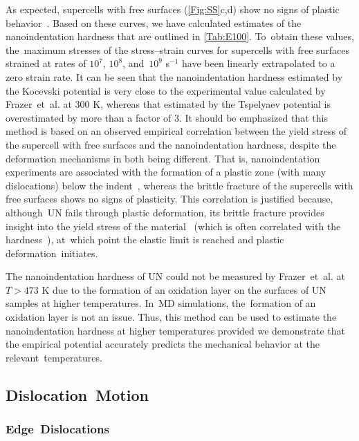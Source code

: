 \documentclass[applsci,article,accept,pdftex,moreauthors]{Definitions/mdpi}
\newcommand{\?}{\stackrel{?}{=}}
\begin{document}
As expected, supercells with free surfaces (\cref{Fig:SS}c,d) show no signs of plastic behavior~\cite{Ivashchenko2007}. Based on these curves, we have calculated estimates of the nanoindentation hardness that are outlined in \cref{Tab:E100}. To~obtain these values, the~maximum stresses of the stress--strain curves for supercells with free surfaces strained at rates of $10^7$, $10^8$, and~$10^9$ s$^{-1}$ have been linearly extrapolated to a zero strain rate. It can be seen that the nanoindentation hardness estimated by the Kocevski potential is very close to the experimental value calculated by Frazer~et~al. \cite{Frazer2021} at 300 K, whereas that estimated by the Tspelyaev potential is overestimated by more than a factor of 3. It should be emphasized that this method is based on an observed empirical correlation between the yield stress of the supercell with free surfaces and the nanoindentation hardness, despite the deformation mechanisms in both being different. That is, nanoindentation experiments are associated with the formation of a plastic zone (with many dislocations) below the indent~\cite{Adachi2009}, whereas the brittle fracture of the supercells with free surfaces shows no signs of plasticity. This correlation is justified because, although~UN fails through plastic deformation, its brittle fracture provides insight into the yield stress of the material~\cite{Taylor2008} (which is often correlated with the hardness~\cite{Meyers2009}), at~which point the elastic limit is reached and plastic deformation~initiates.

The nanoindentation hardness of UN could not be measured by Frazer~et~al. \cite{Frazer2021} at $T > 473$ K due to the formation of an oxidation layer on the surfaces of UN samples at higher temperatures. In~MD simulations, the~formation of an oxidation layer is not an issue. Thus, this method can be used to estimate the nanoindentation hardness at higher temperatures provided we demonstrate that the empirical potential accurately predicts the mechanical behavior at the relevant~temperatures.

\subsection{Dislocation~Motion}
\label{Sec:DislocMotion}

\subsubsection{Edge~Dislocations}
\end{document}
